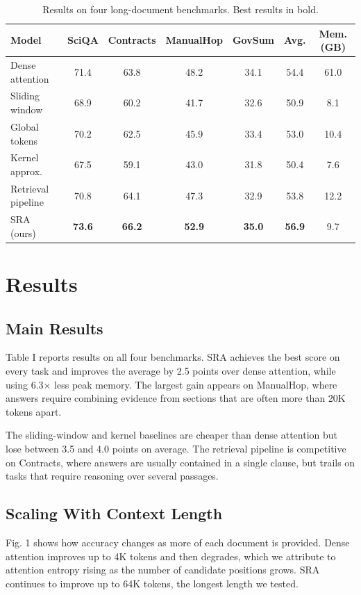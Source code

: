\documentclass[conference,letterpaper]{IEEEtran}
\begin{document}
\begin{table}[t]
\centering
\caption{Results on four long-document benchmarks. Best results in bold.}
\label{tab:results}
\begin{tabular}{lcccccc}
\toprule
Model & SciQA & Contracts & ManualHop & GovSum & Avg. & Mem. (GB) \\
\midrule
Dense attention & 71.4 & 63.8 & 48.2 & 34.1 & 54.4 & 61.0 \\
Sliding window & 68.9 & 60.2 & 41.7 & 32.6 & 50.9 & 8.1 \\
Global tokens & 70.2 & 62.5 & 45.9 & 33.4 & 53.0 & 10.4 \\
Kernel approx. & 67.5 & 59.1 & 43.0 & 31.8 & 50.4 & 7.6 \\
Retrieval pipeline & 70.8 & 64.1 & 47.3 & 32.9 & 53.8 & 12.2 \\
\midrule
SRA (ours) & \textbf{73.6} & \textbf{66.2} & \textbf{52.9} & \textbf{35.0} & \textbf{56.9} & 9.7 \\
\bottomrule
\end{tabular}
\end{table}

\section{Results}

\subsection{Main Results}

Table I reports results on all four benchmarks. SRA achieves the best score on every task and improves the average by 2.5 points over dense attention, while using 6.3$\times$ less peak memory. The largest gain appears on ManualHop, where answers require combining evidence from sections that are often more than 20K tokens apart.

The sliding-window and kernel baselines are cheaper than dense attention but lose between 3.5 and 4.0 points on average. The retrieval pipeline is competitive on Contracts, where answers are usually contained in a single clause, but trails on tasks that require reasoning over several passages.

\subsection{Scaling With Context Length}

Fig. 1 shows how accuracy changes as more of each document is provided. Dense attention improves up to 4K tokens and then degrades, which we attribute to attention entropy rising as the number of candidate positions grows. SRA continues to improve up to 64K tokens, the longest length we tested.
\end{document}
